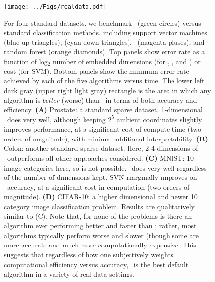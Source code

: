 \documentclass[10pt]{article}
\begin{document}
\begin{figure}
\centering
\texttt{[image: ../Figs/realdata.pdf]}
\caption{
For four standard datasets, we benchmark \Lol~(green circles) versus standard classification methods, including support vector machines (blue up triangles),  (cyan down triangles), ~(magenta pluses), and random forest (orange diamonds). 
Top panels show error rate as a function of log$_2$ number of embedded dimensions (for \Lol, , and ) or cost (for SVM).
Bottom panels show the minimum error rate achieved by each of the five algorithms versus time.
The lower left dark gray (upper right light gray) rectangle is the area in which any algorithm is \emph{better}  (worse) than \Lol~in terms of both accuracy and efficiency.
\textbf{(A)} Prostate: a standard sparse dataset.  1-dimensional \Lol~does very well, although keeping $2^5$ ambient coordinates slightly improves performance, at a significant cost of compute time (two orders of magnitude), with minimal additional interpretability.
\textbf{(B)} Colon: another standard sparse dataset.  Here, 2-4 dimensions of \Lol~outperforms all other approaches considered.
\textbf{(C)} MNIST: 10 image categories here, so  is not possible.  \Lol~does very well regardless of the number of dimensions kept.  SVN marginally improves on \Lol~accuracy, at a significant cost in computation (two orders of magnitude).
\textbf{(D)} CIFAR-10: a higher dimensional and newer 10 category image classification problem.  Results are qualitatively similar to (C).
% 
Note that, for none of the problems is there an algorithm ever performing better and faster than \Lol; rather, most algorithms typically perform worse and slower (though some are more accurate and much more computationally expensive. 
This suggests that regardless of how one subjectively weights computational efficiency versus accuracy, \Lol~is the best default algorithm in a variety of real data settings.
}
\label{fig:realdata}
\end{figure}
\end{document}
